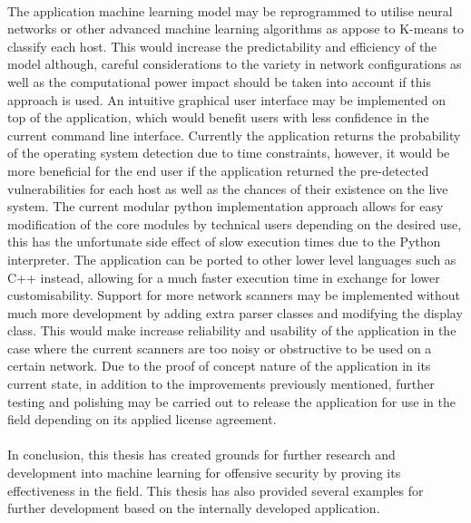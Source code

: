 \paragraph{}The application machine learning model may be reprogrammed to utilise neural networks or other advanced machine learning algorithms as appose to K-means to classify each host. This would increase the predictability and efficiency of the model although, careful considerations to the variety in network configurations as well as the computational power impact should be taken into account if this approach is used. An intuitive graphical user interface may be implemented on top of the application, which would benefit users with less confidence in the current command line interface. Currently the application returns the probability of the operating system detection due to time constraints, however, it would be more beneficial for the end user if the application returned the pre-detected vulnerabilities for each host as well as the chances of their existence on the live system. The current modular python implementation approach allows for easy modification of the core modules by technical users depending on the desired use, this has the unfortunate side effect of slow execution times due to the Python interpreter.  The application can be ported to other lower level languages such as C++ instead, allowing for a much faster execution time in exchange for lower customisability. Support for more network scanners may be implemented without much more development by adding extra parser classes and modifying the display class. This would make increase reliability and usability of the application in the case where the current scanners are too noisy or obstructive to be used on a certain network. Due to the proof of concept nature of the application in its current state, in addition to the improvements previously mentioned, further testing and polishing may be carried out to release the application for use in the field depending on its applied license agreement.

\paragraph{}In conclusion, this thesis has created grounds for further research and development into machine learning for offensive security by proving its effectiveness in the field. This thesis has also provided several examples for further development based on the internally developed application. 
